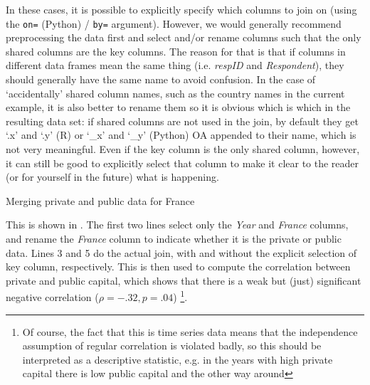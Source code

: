 In these cases, it is possible to explicitly specify which columns to join on (using the \verb+on=+ (Python) / \verb+by=+ argument).
However, we would generally recommend preprocessing the data first and select and/or rename columns such that the only shared columns are the key columns.
The reason for that is that if columns in different data frames mean the same thing (i.e. \emph{respID} and \emph{Respondent}), they should generally have the same name to avoid confusion.
In the case of `accidentally' shared column names, such as the country names in the current example,
it is also better to rename them so it is obvious which is which in the resulting data set:
if shared columns are not used in the join, by default they get `.x' and `.y' (R) or `\_x' and `\_y' (Python) OA appended to their name, which is not very meaningful.
Even if the key column is the only shared column, however, it can still be good to explicitly select that column to make it clear to the reader (or for yourself in the future) what is happening. 

\begin{ccsexample}
\caption{Merging private and public data for France}\label{ex:merge}
\end{ccsexample}



This is shown in .
The first two lines select only the \emph{Year} and \emph{France} columns, and rename the \emph{France} column to indicate whether it is the private or public data.
Lines 3 and 5 do the actual join, with and without the explicit selection of key column, respectively.
This is then used to compute the correlation between private and public capital, 
which shows that there is a weak but (just) significant negative correlation ($\rho=-.32, p=.04$)%
\footnote{Of course, the fact that this is time series data means that the independence assumption of regular correlation is violated badly, so this should be interpreted as a descriptive statistic, e.g. in the years with high private capital there is low public capital and the other way around}.




